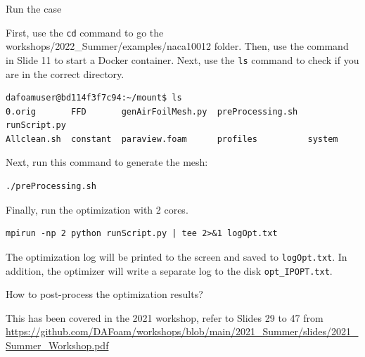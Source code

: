 \documentclass{bredelebeamer}
\begin{document}
\begin{frame}[fragile]{Run the case}

  First, use the \texttt{cd} command to go the workshops/2022\_Summer/examples/naca10012 folder. Then, use the command in Slide 11 to start a Docker container. Next, use the \texttt{ls} command to check if you are in the correct directory.
  \footnotesize
  \lstset{ language=bash }
  \begin{lstlisting}
dafoamuser@bd114f3f7c94:~/mount$ ls
0.orig       FFD       genAirFoilMesh.py  preProcessing.sh  runScript.py
Allclean.sh  constant  paraview.foam      profiles          system
  \end{lstlisting}
  \normalsize

  Next, run this command to generate the mesh:
  \footnotesize
  \lstset{ language=bash }
  \begin{lstlisting}
./preProcessing.sh
  \end{lstlisting}
  \normalsize

  Finally, run the optimization with 2 cores.
  \footnotesize
  \lstset{ language=bash }
  \begin{lstlisting}
mpirun -np 2 python runScript.py | tee 2>&1 logOpt.txt
  \end{lstlisting}
  \normalsize

  The optimization log will be printed to the screen and saved to \texttt{logOpt.txt}. In addition, the optimizer will write a separate log to the disk \texttt{opt\_IPOPT.txt}.

\end{frame}

\begin{frame}[fragile]{How to post-process the optimization results?}

  This has been covered in the 2021 workshop, refer to Slides 29 to 47 from 
  \url{https://github.com/DAFoam/workshops/blob/main/2021_Summer/slides/2021_Summer_Workshop.pdf}

\end{frame}
\end{document}
